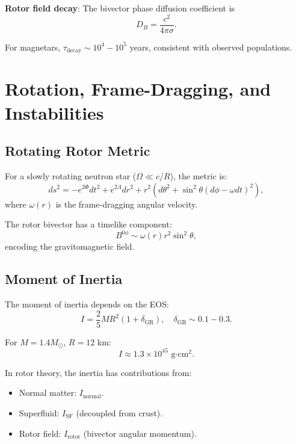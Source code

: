 \documentclass[12pt,a4paper]{article}
\theoremstyle{definition}
\theoremstyle{remark}
\begin{document}
\textbf{Rotor field decay}: The bivector phase diffusion coefficient is
\begin{equation}
D_B = \frac{c^2}{4\pi \sigma}.
\end{equation}

For magnetars, $\tau_{\text{decay}} \sim 10^4-10^5$ years, consistent with observed populations.

\section{Rotation, Frame-Dragging, and Instabilities}

\subsection{Rotating Rotor Metric}

For a slowly rotating neutron star ($\Omega \ll c/R$), the metric is:
\begin{equation}
ds^2 = -e^{2\Phi} dt^2 + e^{2\Lambda} dr^2 + r^2(d\theta^2 + \sin^2\theta (d\phi - \omega dt)^2),
\end{equation}
where $\omega(r)$ is the frame-dragging angular velocity.

The rotor bivector has a timelike component:
\begin{equation}
B^{0\phi} \sim \omega(r) r^2 \sin^2\theta,
\end{equation}
encoding the gravitomagnetic field.

\subsection{Moment of Inertia}

The moment of inertia depends on the EOS:
\begin{equation}
I = \frac{2}{5} M R^2 \left(1 + \delta_{\text{GR}}\right), \quad \delta_{\text{GR}} \sim 0.1-0.3.
\end{equation}

For $M = 1.4 M_\odot$, $R = 12$ km:
\begin{equation}
I \approx 1.3 \times 10^{45} \text{ g·cm}^2.
\end{equation}

In rotor theory, the inertia has contributions from:
\begin{itemize}
\item Normal matter: $I_{\text{normal}}$.
\item Superfluid: $I_{\text{SF}}$ (decoupled from crust).
\item Rotor field: $I_{\text{rotor}}$ (bivector angular momentum).
\end{itemize}
\end{document}
